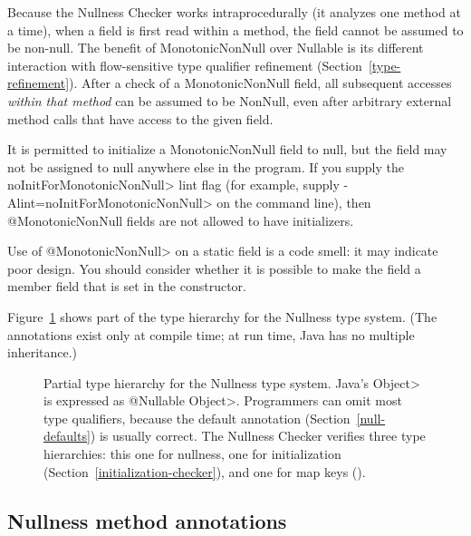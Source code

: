 \begin{description}
  \begin{sloppypar}
  Because the Nullness Checker works intraprocedurally (it analyzes one
  method at a time), when a  field is first read within a
  method, the field cannot be assumed to be non-null.  The benefit of
  MonotonicNonNull over Nullable is its different interaction with
  flow-sensitive type qualifier refinement (Section~\ref{type-refinement}).
  After a check of a MonotonicNonNull
  field, all subsequent accesses \emph{within that method} can be assumed
  to be NonNull, even after arbitrary external method calls that have
  access to the given field.
  \end{sloppypar}

  It is permitted to initialize a MonotonicNonNull field to null, but the
  field may not be assigned to null anywhere else in the program.  If you
  supply the \<noInitForMonotonicNonNull> lint flag (for example, supply
  \<-Alint=noInitForMonotonicNonNull> on the command line), then
  @MonotonicNonNull fields are not allowed to have initializers.

  Use of \<@MonotonicNonNull> on a static field is a code smell:  it may
  indicate poor design.  You should consider whether it is possible to make
  the field a member field that is set in the constructor.

\end{description}

Figure~\ref{fig-nullness-hierarchy} shows part of the type hierarchy for the
Nullness type system.
(The annotations exist only at compile time; at run time, Java has no
multiple inheritance.)

\begin{figure}
\caption{Partial type hierarchy for the Nullness type system.
Java's \<Object> is expressed as \<@Nullable Object>.  Programmers can omit
most type qualifiers, because the default annotation
(Section~\ref{null-defaults}) is usually correct.
The Nullness Checker verifies three type hierarchies:  this one for
nullness, one for initialization (Section~\ref{initialization-checker}),
and one for map keys ().}
\label{fig-nullness-hierarchy}
\end{figure}


\subsection{Nullness method annotations\label{nullness-method-annotations}}

